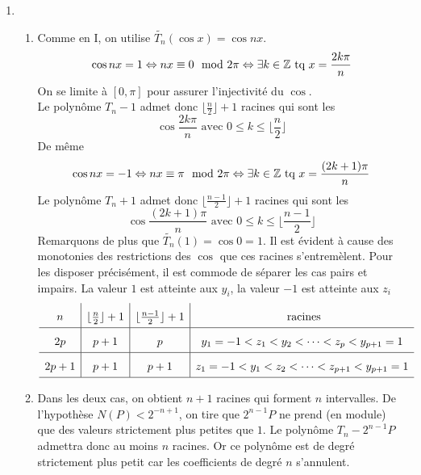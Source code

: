 \begin{enumerate}
\item \begin{enumerate}
 \item Comme en I, on utilise $\widetilde{T_n}(\cos x)=\cos nx$.
\begin{displaymath}
 \cos nx = 1 \Leftrightarrow nx \equiv 0\mod 2\pi
\Leftrightarrow \exists k\in \mathbb{Z} \text{ tq } x=\frac{2k\pi}{n}
\end{displaymath}
On se limite à $[0,\pi]$ pour assurer l'injectivité du $\cos$.\\
Le polynôme $T_n-1$ admet donc  $\lfloor\frac{n}{2}\rfloor+1$ racines qui sont les 
\begin{displaymath}
 \cos \frac{2k\pi}{n} \text{ avec } 0\leq k \leq \lfloor\frac{n}{2}\rfloor
\end{displaymath}
De même 
\begin{displaymath}
 \cos nx = -1 \Leftrightarrow nx \equiv \pi\mod 2\pi
\Leftrightarrow \exists k\in \mathbb{Z} \text{ tq } x=\frac{(2k+1)\pi}{n}
\end{displaymath}
Le polynôme $T_n + 1$ admet donc  $\lfloor\frac{n-1}{2}\rfloor+1$ racines qui sont les 
\begin{displaymath}
 \cos \frac{(2k+1)\pi}{n} \text{ avec } 0\leq k \leq \lfloor\frac{n-1}{2}\rfloor
\end{displaymath}
Remarquons de plus que $\widetilde{T_n}(1)=\cos 0=1$. Il est évident à cause des monotonies des restrictions des $\cos$ que ces racines s'entremèlent. Pour les disposer précisément, il est commode de séparer les cas pairs et impairs. La valeur $1$ est atteinte aux $y_i$, la valeur $-1$ est atteinte aux $z_i$
\begin{displaymath}
\renewcommand{\arraystretch}{1.8}
 \begin{array}{c|c|c|c}
 n & \lfloor\frac{n}{2}\rfloor+1 & \lfloor\frac{n-1}{2}\rfloor+1 & \text{ racines} \\ \hline
2p & p+1                         &   p & y_1=-1<z_1<y_2<\cdots < z_p<y_{p+1}=1  \\ \hline
2p+1 & p+1                       & p+1 & z_1=-1<y_1<z_2<\cdots < z_{p+1}<y_{p+1}=1  \\ \hline
\end{array}
\end{displaymath}
\item Dans les deux cas, on obtient $n+1$ racines qui forment $n$ intervalles. De l'hypothèse $N(P)<2^{-n+1}$, on tire que $2^{n-1}P$ ne prend (en module) que des valeurs strictement plus petites que $1$. Le polynôme $T_n - 2^{n-1}P$ admettra donc au moins $n$ racines. Or ce polynôme est de degré strictement plus petit car les coefficients de degré $n$ s'annulent.

\end{enumerate}
\end{enumerate}
